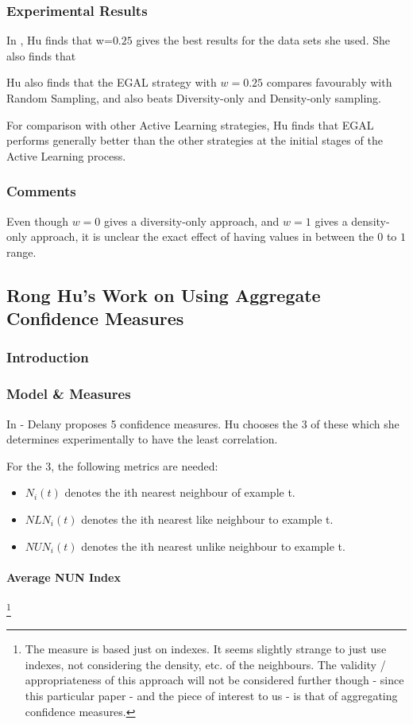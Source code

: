 \documentclass[a4paper,11pt]{report}
\begin{document}
\subsubsection{Experimental Results}
In \citet{Hu2011}, Hu finds that w=$0.25$ gives the best results for the data sets she used. She also finds that 

Hu also finds that the EGAL strategy with $w=0.25$ compares favourably with Random Sampling, and also beats Diversity-only and Density-only sampling.

For comparison with other Active Learning strategies, Hu finds that EGAL performs generally better than the other strategies at the initial stages of the Active Learning process.

\subsubsection{Comments}
Even though $w=0$ gives a diversity-only approach, and $w=1$ gives a density-only approach, it is unclear the exact effect of having values in between the $0$ to $1$ range.

\subsection{Rong Hu's Work on Using Aggregate Confidence Measures}
\subsubsection{Introduction}

\subsubsection{Model \& Measures}

In \citet{Delany2005} - Delany proposes 5 confidence measures. Hu chooses the 3 of these which she determines experimentally to have the least correlation.

For the 3, the following metrics are needed:
\begin{itemize} 
	\item $N_{i}(t)$ denotes the ith nearest neighbour of example t.
	\item $NLN_{i}(t)$ denotes the ith nearest like neighbour to example t.
	\item $NUN_{i}(t)$ denotes the ith nearest unlike neighbour to example t.
\end{itemize}

\paragraph{Average NUN Index} \footnote{The measure is based just on indexes. It seems slightly strange to just use indexes, not considering the density, etc. of the neighbours. The validity / appropriateness of this approach will not be considered further though - since this particular paper - and the piece of interest to us - is that of aggregating confidence measures.}
\end{document}
